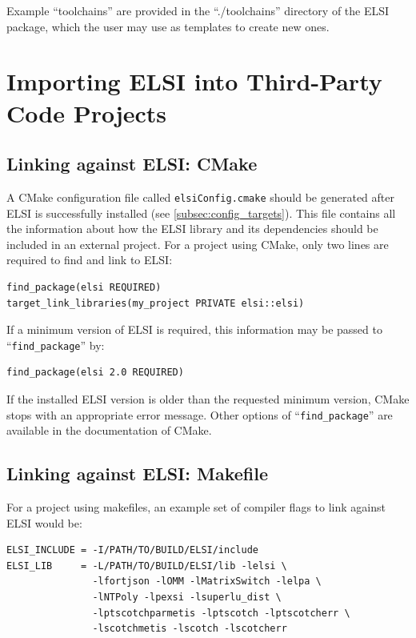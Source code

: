 \documentclass{report}
\begin{document}
Example ``toolchains'' are provided in the ``./toolchains'' directory of the ELSI package, which the user may use as templates to create new ones.

\section{Importing ELSI into Third-Party Code Projects}
\label{sec:import}
\subsection{Linking against ELSI: CMake}
\label{subsec:import_cmake}
A CMake configuration file called \texttt{elsiConfig.cmake} should be generated after ELSI is successfully installed (see \ref{subsec:config_targets}). This file contains all the information about how the ELSI library and its dependencies should be included in an external project. For a project using CMake, only two lines are required to find and link to ELSI:
\begin{tcolorbox}
\begin{verbatim}
find_package(elsi REQUIRED)
target_link_libraries(my_project PRIVATE elsi::elsi)
\end{verbatim}
\end{tcolorbox}

If a minimum version of ELSI is required, this information may be passed to ``\verb+find_package+'' by:
\begin{tcolorbox}
\begin{verbatim}
find_package(elsi 2.0 REQUIRED)
\end{verbatim}
\end{tcolorbox}

If the installed ELSI version is older than the requested minimum version, CMake stops with an appropriate error message. Other options of ``\verb+find_package+'' are available in the documentation of CMake.

\subsection{Linking against ELSI: Makefile}
\label{subsec:import_makefile}
For a project using makefiles, an example set of compiler flags to link against ELSI would be:
\begin{tcolorbox}
\begin{verbatim}
ELSI_INCLUDE = -I/PATH/TO/BUILD/ELSI/include
ELSI_LIB     = -L/PATH/TO/BUILD/ELSI/lib -lelsi \
               -lfortjson -lOMM -lMatrixSwitch -lelpa \
               -lNTPoly -lpexsi -lsuperlu_dist \
               -lptscotchparmetis -lptscotch -lptscotcherr \
               -lscotchmetis -lscotch -lscotcherr
\end{verbatim}
\end{tcolorbox}
\end{document}
